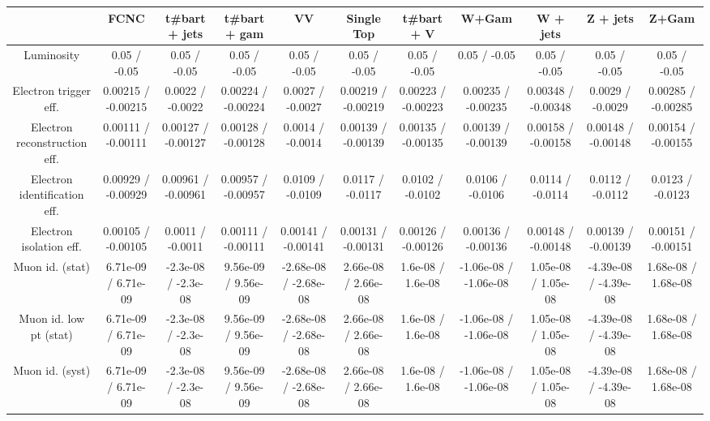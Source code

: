 \begin{table}[htbp]
\begin{center}
\footnotesize
\begin{tabular}{|c|c|c|c|c|c|c|c|c|c|c|}
\hline 
      & FCNC      & t#bar{t} + jets      & t#bar{t} +  gam      & VV      & Single Top      & t#bar{t} + V      & W+Gam      & W + jets      & Z + jets      & Z+Gam \\ 
\hline 
  Luminosity & 0.05 / -0.05 & 0.05 / -0.05 & 0.05 / -0.05 & 0.05 / -0.05 & 0.05 / -0.05 & 0.05 / -0.05 & 0.05 / -0.05 & 0.05 / -0.05 & 0.05 / -0.05 & 0.05 / -0.05 \\ 
  Electron trigger eff. & 0.00215 / -0.00215 & 0.0022 / -0.0022 & 0.00224 / -0.00224 & 0.0027 / -0.0027 & 0.00219 / -0.00219 & 0.00223 / -0.00223 & 0.00235 / -0.00235 & 0.00348 / -0.00348 & 0.0029 / -0.0029 & 0.00285 / -0.00285 \\ 
  Electron reconstruction eff. & 0.00111 / -0.00111 & 0.00127 / -0.00127 & 0.00128 / -0.00128 & 0.0014 / -0.0014 & 0.00139 / -0.00139 & 0.00135 / -0.00135 & 0.00139 / -0.00139 & 0.00158 / -0.00158 & 0.00148 / -0.00148 & 0.00154 / -0.00155 \\ 
  Electron identification eff. & 0.00929 / -0.00929 & 0.00961 / -0.00961 & 0.00957 / -0.00957 & 0.0109 / -0.0109 & 0.0117 / -0.0117 & 0.0102 / -0.0102 & 0.0106 / -0.0106 & 0.0114 / -0.0114 & 0.0112 / -0.0112 & 0.0123 / -0.0123 \\ 
  Electron isolation eff. & 0.00105 / -0.00105 & 0.0011 / -0.0011 & 0.00111 / -0.00111 & 0.00141 / -0.00141 & 0.00131 / -0.00131 & 0.00126 / -0.00126 & 0.00136 / -0.00136 & 0.00148 / -0.00148 & 0.00139 / -0.00139 & 0.00151 / -0.00151 \\ 
  Muon id. (stat) & 6.71e-09 / 6.71e-09 & -2.3e-08 / -2.3e-08 & 9.56e-09 / 9.56e-09 & -2.68e-08 / -2.68e-08 & 2.66e-08 / 2.66e-08 & 1.6e-08 / 1.6e-08 & -1.06e-08 / -1.06e-08 & 1.05e-08 / 1.05e-08 & -4.39e-08 / -4.39e-08 & 1.68e-08 / 1.68e-08 \\ 
  Muon id. low pt (stat) & 6.71e-09 / 6.71e-09 & -2.3e-08 / -2.3e-08 & 9.56e-09 / 9.56e-09 & -2.68e-08 / -2.68e-08 & 2.66e-08 / 2.66e-08 & 1.6e-08 / 1.6e-08 & -1.06e-08 / -1.06e-08 & 1.05e-08 / 1.05e-08 & -4.39e-08 / -4.39e-08 & 1.68e-08 / 1.68e-08 \\ 
  Muon id. (syst) & 6.71e-09 / 6.71e-09 & -2.3e-08 / -2.3e-08 & 9.56e-09 / 9.56e-09 & -2.68e-08 / -2.68e-08 & 2.66e-08 / 2.66e-08 & 1.6e-08 / 1.6e-08 & -1.06e-08 / -1.06e-08 & 1.05e-08 / 1.05e-08 & -4.39e-08 / -4.39e-08 & 1.68e-08 / 1.68e-08 \\ 

\end{tabular}
\end{center}
\end{table}
